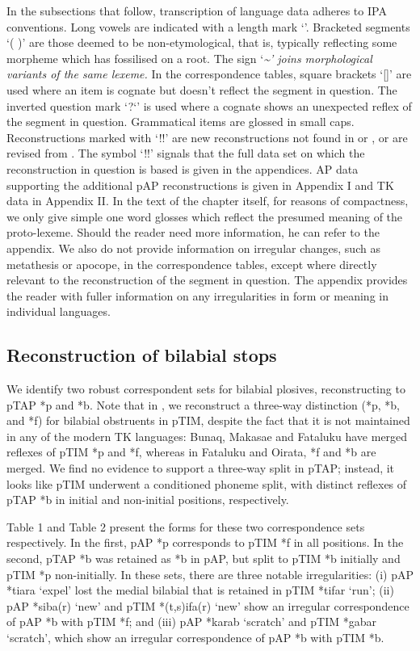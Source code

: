 In the subsections that follow, transcription of language data adheres to IPA conventions. Long vowels are indicated with a length mark `{\textlengthmark}'. Bracketed segments `( )' are those deemed to be non-etymological, that is, typically reflecting some morpheme which has fossilised on a root. The sign `\emph{\textup{\~{}' joins morphological variants of the same lexeme. }}In the correspondence tables, square brackets `[]' are used where an item is cognate but doesn't reflect the segment in question. The inverted question mark `?`' is used where a cognate shows an unexpected reflex of the segment in question. Grammatical items are glossed in small caps. Reconstructions marked with `!!' are new reconstructions not found in \citet{HoltonEtAl2012} or \citet{SchapperEtAl2012}, or are revised from \citet{HoltonEtAl2012}. The symbol `!!' signals that the full data set on which the reconstruction in question is based is given in the appendices. AP data supporting the additional pAP reconstructions is given in
Appendix I and TK data in Appendix II. In the text of the chapter itself, for reasons of compactness, we only give simple one word glosses which reflect the presumed meaning of the proto-lexeme. Should the reader need more information, he can refer to the appendix. We also do not provide information on irregular changes, such as metathesis or apocope, in the correspondence tables, except where directly relevant to the reconstruction of the segment in question. The appendix provides the reader with fuller information on any irregularities in form or meaning in individual languages.

\subsection{Reconstruction of bilabial stops}
We identify two robust correspondent sets for bilabial plosives, reconstructing to pTAP *p and *b. Note that in \citet{SchapperEtAl2012}, we reconstruct a three-way distinction (*p, *b, and *f) for bilabial obstruents in pTIM, despite the fact that it is not maintained in any of the modern TK languages: Bunaq, Makasae and Fataluku have merged reflexes of pTIM *p and *f, whereas in Fataluku and Oirata, *f and *b are merged. We find no evidence to support a three-way split in pTAP; instead, it looks like pTIM underwent a conditioned phoneme split, with distinct reflexes of pTAP *b in initial and non-initial positions, respectively.

Table 1 and Table 2 present the forms for these two correspondence sets respectively. In the first, pAP *p corresponds to pTIM *f in all positions. In the second, pTAP *b was retained as *b in pAP, but split to pTIM *b initially and pTIM *p non-initially. In these sets, there are three notable irregularities: (i) pAP *tiara `expel' lost the medial bilabial that is retained in pTIM *tifar `run'; (ii) pAP *siba(r) `new' and pTIM *(t,s)ifa(r) `new' show an irregular correspondence of pAP *b with pTIM *f; and (iii) pAP *karab `scratch' and pTIM *gabar `scratch', which show an irregular correspondence of pAP *b with pTIM *b.


